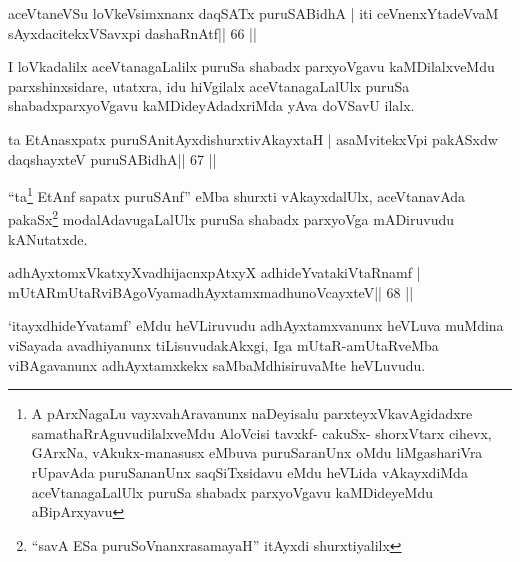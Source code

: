 

\begin{shl}
aceVtaneVSu loVkeV\s simxnanx daqSATx puruSABidhA |
iti ceVnenxYtadeVvaM sAyxdacitekxVSavxpi dashaRnAtf\hfill || 66 ||
\end{shl}

\begin{artha}
I loVkadalilx aceVtanagaLalilx puruSa shabadx parxyoVgavu kaMDilalxveMdu parxshinxsidare, utatxra, idu hiVgilalx aceVtanagaLalUlx puruSa shabadxparxyoVgavu kaMDideyAdadxriMda yAva doVSavU ilalx.
\end{artha}



\begin{shl}
ta EtAnasxpatx puruSAnitAyxdishurxtivAkayxtaH |
asaMvitekxV\s pi pakASxdw daqshayxteV puruSABidhA\hfill || 67 ||
\end{shl}

\begin{artha}
``ta\footnote{A pArxNagaLu vayxvahAravanunx naDeyisalu
    parxteyxVkavAgidadxre samathaRrAguvudilalxveMdu AloVcisi tavxkf-
    cakuSx- shorxVtarx cihevx, GArxNa, vAkukx-manasusx eMbuva
    puruSaranUnx oMdu liMgashariVra rUpavAda puruSananUnx
    saqSiTxsidavu eMdu heVLida vAkayxdiMda aceVtanagaLalUlx puruSa
    shabadx parxyoVgavu kaMDideyeMdu aBipArxyavu} EtAnf sapatx puruSAnf'' eMba shurxti vAkayxdalUlx,
  aceVtanavAda pakaSx\footnote{``savA ESa puruSoV\s nanxrasamayaH''
    itAyxdi shurxtiyalilx} modalAdavugaLalUlx puruSa shabadx
  parxyoVga mADiruvudu kANutatxde.
\end{artha}



\begin{shl}
adhAyxtomxVkatxyXvadhijacnxpAtxyX adhideYvatakiVtaRnamf |
mUtARmUtaRviBAgoV\s yamadhAyxtamxmadhunoVcayxteV\hfill || 68 ||
\end{shl}

\begin{artha}
`itayxdhideYvatamf' eMdu heVLiruvudu adhAyxtamxvanunx heVLuva muMdina  viSayada avadhiyanunx tiLisuvudakAkxgi, Iga mUtaR-amUtaRveMba   viBAgavanunx adhAyxtamxkekx saMbaMdhisiruvaMte heVLuvudu.
\end{artha}

